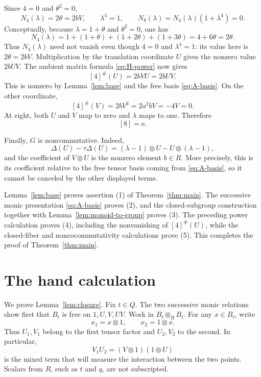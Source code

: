 \documentclass[11pt]{amsart}
\theoremstyle{remark}
\newcommand{\ot}{\otimes}
\newcommand{\unit}{\mathrm e}
\begin{document}
Since \(4=0\) and \(\theta^2=0\),
\begin{equation}\label{eq:norms}
 N_4(\lambda)=2\theta=2bV,\qquad
 \lambda^4=1,\qquad
 N_8(\lambda)=N_4(\lambda)(1+\lambda^4)=0.
\end{equation}
Conceptually, because \(\lambda=1+\theta\) and \(\theta^2=0\), one has
\[
 N_4(\lambda)
 =1+(1+\theta)+(1+2\theta)+(1+3\theta)
 =4+6\theta=2\theta.
\]
Thus \(N_4(\lambda)\) need not vanish even though \(4=0\) and
\(\lambda^4=1\): its value here is \(2\theta=2bV\).  Multiplication by
the translation coordinate \(U\) gives the nonzero value \(2bUV\).
The ambient matrix formula \eqref{eq:H-power} now gives
\[
 [4]^\#(U)=2bVU=2bUV.
\]
This is nonzero by Lemma~\ref{lem:base} and the free basis
\eqref{eq:A-basis}.  On the other coordinate,
\[
 [4]^\#(V)=2bV^2=2a^2bV=-4V=0.
\]
At eight, both \(U\) and \(V\) map to zero and \(\lambda\) maps to one.
Therefore
\[
 [8]=\unit.
\]

Finally, \(G\) is noncommutative.  Indeed,
\[
 \Delta(U)-\tau\Delta(U)
 =(\lambda-1)\ot U-U\ot(\lambda-1),
\]
and the coefficient of \(V\ot U\) is the nonzero element \(b\in R\).
More precisely, this is its coefficient relative to the free tensor
basis coming from \eqref{eq:A-basis}, so it cannot be canceled by the
other displayed terms.

Lemma~\ref{lem:base} proves assertion (1) of
Theorem~\ref{thm:main}.  The successive monic presentation
\eqref{eq:A-basis} proves (2), and the closed-subgroup construction
together with Lemma~\ref{lem:monoid-to-group} proves (3).  The preceding
power calculation proves (4), including the nonvanishing of
\([4]^\#(U)\), while the closed-fiber and noncocommutativity calculations
prove (5).  This completes the proof of Theorem~\ref{thm:main}.

\appendix

\section{The hand calculation}\label{app:closure}

We prove Lemma~\ref{lem:closure}.  Fix \(t\in Q\).  The two successive
monic relations show first that \(B_t\) is free on \(1,U,V,UV\).
Work in \(B_t\ot_R B_t\).  For any \(x\in B_t\), write
\[
 x_1=x\ot1,\qquad x_2=1\ot x.
\]
Thus \(U_1,V_1\) belong to the first tensor factor and \(U_2,V_2\) to
the second.  In particular,
\[
 V_1U_2=(V\ot1)(1\ot U)
\]
is the mixed term that will measure the interaction between the two
points.  Scalars from \(R\), such as \(t\) and \(q\), are not
subscripted.
\end{document}
